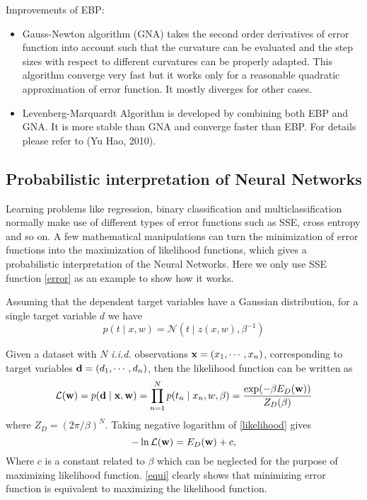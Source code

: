 \documentclass[paper=a4, fontsize=12pt]{scrartcl}	%
\numberwithin{equation}{section}					%
\numberwithin{figure}{section}					%
\numberwithin{table}{section}					%
\begin{document}
Improvements of EBP:
\begin{itemize}
\item Gauss-Newton algorithm (GNA) takes the second order derivatives of error function into account such that the curvature can be evaluated and the step sizes with respect to different curvatures can be properly adapted. This algorithm converge very fast but it works only for a reasonable quadratic approximation of error function. It mostly diverges for other cases. 
\item Levenberg-Marquardt Algorithm is developed by combining both EBP and GNA. It is more stable than GNA and converge faster than EBP. For details please refer to (Yu Hao, 2010).
\end{itemize}

\subsection{Probabilistic interpretation of Neural Networks}
Learning problems like regression, binary classification and multiclassification normally make use of different types of error functions such as SSE, cross entropy and so on. A few mathematical manipulations can turn the minimization of error functions into the maximization of likelihood functions, which gives a probabilistic interpretation of the Neural Networks. Here we only use SSE function \eqref{error} as an example to show how it works. 

Assuming that the dependent target variables have a Gaussian distribution, for a single target variable $d$ we have
\begin{equation}
p(t\mid x,w)=\mathcal N (t\mid z(x,w),\beta^{-1})
\end{equation}

Given a dataset with $N$ {\it i.i.d.} observations ${\bf x} = (x_1, \cdots, x_n)$, corresponding to target variables ${\bf d}= (d_1, \cdots, d_n)$, then the likelihood function can be written as 
\begin{equation}
\mathcal L({\bf w}) =p({\bf d}\mid {\bf x}, {\bf w}) = \prod_{n=1}^N p(t_n\mid x_n, w, \beta)=\frac{\exp(-\beta E_D({\bf w}))}{Z_D(\beta)}\label{likelihood}
\end{equation}
where $Z_D=(2\pi/\beta)^N$. Taking negative logarithm of \eqref{likelihood} gives
\begin{equation}
 -\ln \mathcal L({\bf w})= E_D({\bf w}) + c \label{equi},
\end{equation}
Where $c$ is a constant related to $\beta$ which can be neglected for the purpose of maximizing likelihood function. \eqref{equi} clearly shows that minimizing error function is equivalent to maximizing the likelihood function.
\end{document}
